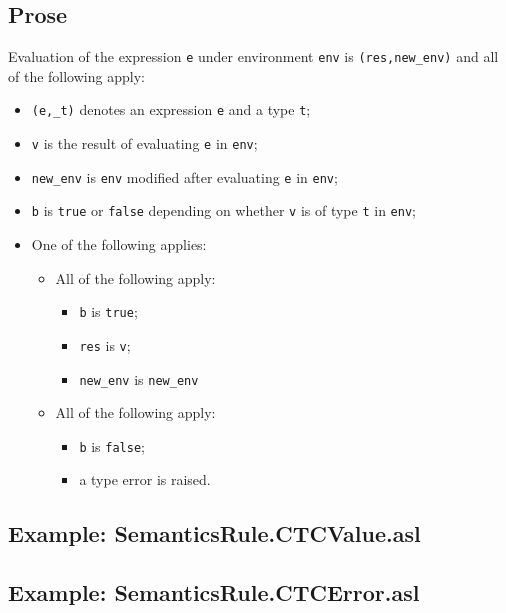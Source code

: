 \documentclass{book}
\begin{document}
  \subsection{Prose}
  Evaluation of the expression \texttt{e} under environment \texttt{env} is
  \texttt{(res,new\_env)} and all of the following apply:
  \begin{itemize}
  \item \texttt{(e,\_t)} denotes an expression \texttt{e} and a type \texttt{t};
  \item \texttt{v} is the result of evaluating \texttt{e} in \texttt{env};
  \item \texttt{new\_env} is \texttt{env} modified after evaluating \texttt{e} in \texttt{env};
  \item \texttt{b} is \texttt{true} or \texttt{false} depending on whether \texttt{v} is of type \texttt{t} in \texttt{env};
  \item One of the following applies:
        \begin{itemize}
        \item All of the following apply:
              \begin{itemize}
              \item \texttt{b} is \texttt{true};
              \item \texttt{res} is \texttt{v};
              \item \texttt{new\_env} is \texttt{new\_env}
              \end{itemize}
        \item All of the following apply:
              \begin{itemize}
              \item \texttt{b} is \texttt{false};
              \item a type error is raised.
              \end{itemize}
        \end{itemize}
  \end{itemize}

  \subsection{Example: SemanticsRule.CTCValue.asl}

  \subsection{Example: SemanticsRule.CTCError.asl}
\end{document}
